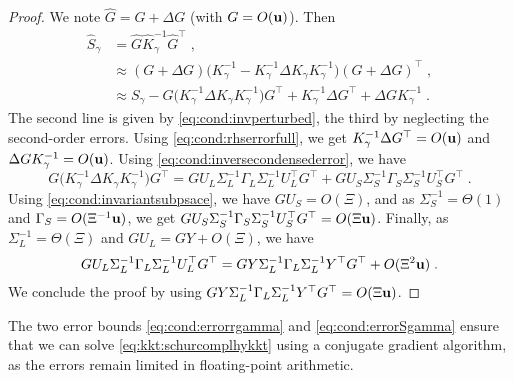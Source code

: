 \begin{proof}
  We note $\widehat{G} = G + \Delta G$ (with $G = O(\mathbf{u})$). Then
  \begin{equation}
    \begin{aligned}
      \widehat{S}_\gamma &= \widehat{G} \widehat{K}_\gamma^{-1} \widehat{G}^\top \; , \\
                         &\approx (G + \Delta G)\big(K_\gamma^{-1} - K_\gamma^{-1}\Delta K_\gamma K_\gamma^{-1}\big)(G + \Delta G)^\top \;, \\
                    &\approx S_\gamma - G \big(K_\gamma^{-1}\Delta K_\gamma K_\gamma^{-1} \big)G^\top
                    + K_\gamma^{-1} \Delta G^\top + \Delta G K_\gamma^{-1} \; .
    \end{aligned}
  \end{equation}
  The second line is given by \eqref{eq:cond:invperturbed},
  the third by neglecting the second-order errors.
  Using \eqref{eq:cond:rhserrorfull}, we get $K_\gamma^{-1} \Delta G^\top = O(\mathbf{u})$
  and $\Delta G K_\gamma^{-1} = O(\mathbf{u})$.
  Using \eqref{eq:cond:inversecondensederror}, we have
  \begin{equation*}
    G \big(K_\gamma^{-1}\Delta K_\gamma K_\gamma^{-1} \big)G^\top =
G U_L \Sigma_L^{-1} \Gamma_L \Sigma_L^{-1}U_L^\top G^\top  +
G U_S \Sigma_S^{-1} \Gamma_S \Sigma_S^{-1}U_S^\top  G^\top \;.
  \end{equation*}
  Using \eqref{eq:cond:invariantsubpsace}, we have $G U_S = O(\Xi)$,
  and as $\Sigma_S^{-1} = \Theta(1)$ and $\Gamma_S = O(\Xi^{-1} \mathbf{u})$, we
  get
  $G U_S \Sigma_S^{-1} \Gamma_S \Sigma_S^{-1}U_S^\top  G^\top = O(\Xi \mathbf{u})$.
  Finally, as $\Sigma_L^{-1} = \Theta(\Xi)$ and $G U_L = GY + O(\Xi)$,
  we have
  \begin{equation}
    G U_L \Sigma_L^{-1} \Gamma_L \Sigma_L^{-1}U_L^\top G^\top =
    G Y \Sigma_L^{-1} \Gamma_L \Sigma_L^{-1}Y^\top G^\top + O(\Xi^2 \mathbf{u}) \; .
  \end{equation}
  We conclude the proof by using
  $G Y \Sigma_L^{-1} \Gamma_L \Sigma_L^{-1}Y^\top G^\top = O(\Xi \mathbf{u})$.
\end{proof}
The two error bounds \eqref{eq:cond:errorrgamma} and
\eqref{eq:cond:errorSgamma} ensure that we can solve
\eqref{eq:kkt:schurcomplhykkt} using a conjugate gradient
algorithm, as the errors remain limited in floating-point
arithmetic.

